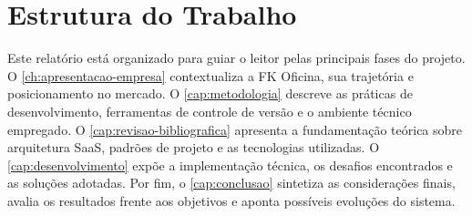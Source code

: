 \section{Estrutura do Trabalho}
\label{sec:estrutura}

Este relatório está organizado para guiar o leitor pelas principais fases do projeto. O \autoref{ch:apresentacao-empresa} contextualiza a FK Oficina, sua trajetória e posicionamento no mercado. O \autoref{cap:metodologia} descreve as práticas de desenvolvimento, ferramentas de controle de versão e o ambiente técnico empregado. O \autoref{cap:revisao-bibliografica} apresenta a fundamentação teórica sobre arquitetura SaaS, padrões de projeto e as tecnologias utilizadas. O \autoref{cap:desenvolvimento} expõe a implementação técnica, os desafios encontrados e as soluções adotadas. Por fim, o \autoref{cap:conclusao} sintetiza as considerações finais, avalia os resultados frente aos objetivos e aponta possíveis evoluções do sistema.